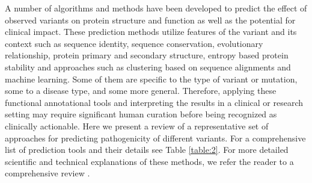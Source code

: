 \documentclass{article}
\begin{document}
A number of algorithms and methods have been developed to predict the
effect of observed variants on protein structure and function as well
as the potential for clinical impact. These prediction methods utilize
features of the variant and its context such as sequence identity,
sequence conservation, evolutionary relationship, protein primary and
secondary structure, entropy based protein stability and approaches
such as clustering based on sequence alignments and machine
learning. Some of them are specific to the type of variant or
mutation, some to a disease type, and some more general. Therefore,
applying these functional annotational tools and interpreting the
results in a clinical or research setting may require significant
human curation before being recognized as clinically actionable. Here
we present a review of a representative set of approaches for
predicting pathogenicity of different variants. For a comprehensive
list of prediction tools and their details see Table
\ref{table:2}. For more detailed scientific and technical explanations
of these methods, we refer the reader to a comprehensive review
\cite{Addepalli2014-oa}.
\end{document}
